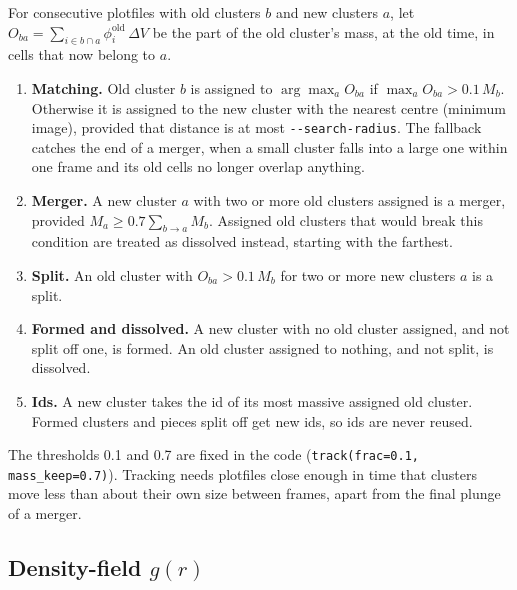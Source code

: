 \documentclass[11pt]{article}
\newcommand{\code}[1]{\texttt{#1}}
\begin{document}
For consecutive plotfiles with old clusters $b$ and new clusters $a$, let
$O_{ba} = \sum_{i\in b\cap a}\phi^{\mathrm{old}}_i\,\Delta V$ be the part of
the old cluster's mass, at the old time, in cells that now belong to $a$.
\begin{enumerate}
  \item \textbf{Matching.} Old cluster $b$ is assigned to
        $\arg\max_a O_{ba}$ if $\max_a O_{ba} > 0.1\,M_b$. Otherwise it is
        assigned to the new cluster with the nearest centre (minimum image),
        provided that distance is at most \code{-{}-search-radius}. The
        fallback catches the end of a merger, when a small cluster falls into
        a large one within one frame and its old cells no longer overlap
        anything.
  \item \textbf{Merger.} A new cluster $a$ with two or more old clusters
        assigned is a merger, provided $M_a \ge 0.7\sum_{b\to a} M_b$.
        Assigned old clusters that would break this condition are treated as
        dissolved instead, starting with the farthest.
  \item \textbf{Split.} An old cluster with $O_{ba} > 0.1\,M_b$ for two or more
        new clusters $a$ is a split.
  \item \textbf{Formed and dissolved.} A new cluster with no old cluster
        assigned, and not split off one, is formed. An old cluster assigned to
        nothing, and not split, is dissolved.
  \item \textbf{Ids.} A new cluster takes the id of its most massive assigned
        old cluster. Formed clusters and pieces split off get new ids, so ids
        are never reused.
\end{enumerate}
The thresholds 0.1 and 0.7 are fixed in the code
(\code{track(frac=0.1, mass\_keep=0.7)}). Tracking needs plotfiles close enough
in time that clusters move less than about their own size between frames,
apart from the final plunge of a merger.

\subsection{\texorpdfstring{Density-field $g(r)$}{Density-field g(r)}}
\end{document}
